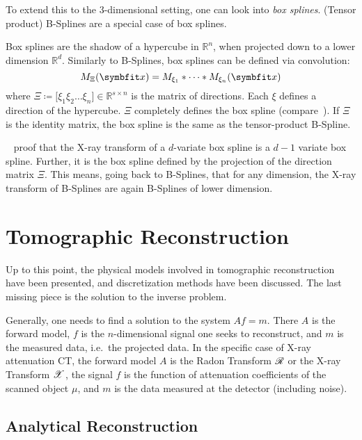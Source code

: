 To extend this to the \(3\)-dimensional setting, one can look into \textit{box splines}. (Tensor
product) B-Splines are a special case of box splines.
\begin{definition}\label{def:box_splines}
	Box splines are the shadow of a hypercube in \(\mathbb{R}^n\), when projected down to a
	lower dimension \(\mathbb{R}^d\). Similarly to B-Splines, box splines can be defined via
	convolution:
	\begin{equation}
		M_\Xi(\mvec{x}) = M_{\xi_1} * \dots * M_{\xi_n}(\mvec{x})
	\end{equation}
	where \(\Xi \coloneq \mathopen[ \xi_1 \xi_2 \dots \xi_n \mathclose] \in \mathbb{R}^{s \times
		n}\) is the matrix of directions. Each \(\xi\) defines a direction of the hypercube. \(\Xi\)
	completely defines the box spline (compare~\cite{de_boor_box_1993}). If \(\Xi\) is the
	identity matrix, the box spline is the same as the tensor-product B-Spline.
\end{definition}

\citeauthor*{entezari_box_2012}~\cite{entezari_box_2012} proof that the X-ray transform of a
\(d\)-variate box spline is a \(d - 1\) variate box spline. Further, it is the box spline defined
by the projection of the direction matrix \(\Xi\). This means, going back to B-Splines, that for any
dimension, the X-ray transform of B-Splines are again B-Splines of lower dimension.

\chapter{Tomographic Reconstruction}\label{chap:tomographic_reconstruction}

Up to this point, the physical models involved in tomographic reconstruction have been presented,
and discretization methods have been discussed. The last missing piece is the solution to the
inverse problem.

Generally, one needs to find a solution to the system \(Af = m\). There \(A\) is the forward model,
\(f\) is the \(n\)-dimensional signal one seeks to reconstruct, and \(m\) is the measured data,
i.e.\ the projected data. In the specific case of X-ray attenuation CT, the forward model \(A\) is
the Radon Transform \(\mathscr{R}\) or the X-ray Transform \(\mathscr{X}\), the signal \(f\) is the function of
attenuation coefficients of the scanned object \(\mu\), and \(m\) is the data measured at the
detector (including noise).

\section{Analytical Reconstruction}\label{sec:analytical_reconstruction}

